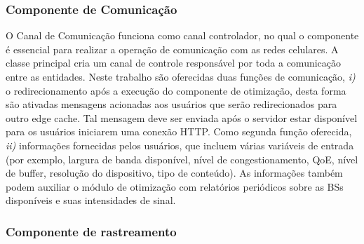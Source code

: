 \subsubsection*{Componente de Comunicação}

O Canal de Comunicação funciona como canal controlador, no qual o componente é essencial para realizar a operação de comunicação com as redes celulares. A classe principal cria um canal de controle responsável por toda a comunicação entre as entidades. Neste trabalho são oferecidas duas funções de comunicação, \textit{i)} o redirecionamento após a execução do componente de otimização, desta forma são ativadas mensagens acionadas aos usuários que serão redirecionados para outro edge cache. Tal mensagem deve ser enviada após o servidor estar disponível para os usuários iniciarem uma conexão HTTP. Como segunda função oferecida, \textit{ii)} informações fornecidas pelos usuários, que incluem várias variáveis de entrada (por exemplo, largura de banda disponível, nível de congestionamento, QoE, nível de buffer, resolução do dispositivo, tipo de conteúdo).
As informações também podem auxiliar o módulo de otimização com relatórios periódicos sobre as BSs disponíveis e suas intensidades de sinal.


\subsubsection*{Componente de rastreamento}

